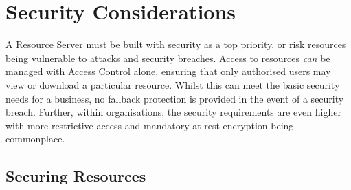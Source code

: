 \section{Security Considerations}
\label{sec:analysis_security}

A Resource Server must be built with security as a top priority, or risk resources being vulnerable to attacks and security breaches. Access to resources \textit{can} be managed with Access Control alone, ensuring that only authorised users may view or download a particular resource. Whilst this can meet the basic security needs for a business, no fallback protection is provided in the event of a security breach. Further, within organisations, the security requirements are even higher with more restrictive access and mandatory at-rest encryption being commonplace.

\subsection{Securing Resources}
\label{subsec:analysis_sec_res}

